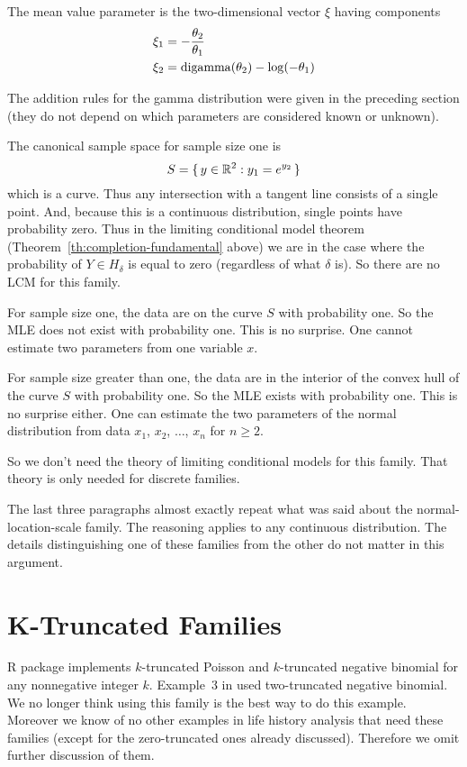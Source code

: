 The mean value parameter is the two-dimensional vector $\xi$ having components
\begin{align*}
   \xi_1
   & =
   - \frac{\theta_2}{\theta_1}
   \\
   \xi_2
   & =
   \operatorname{digamma}(\theta_2) - \log(- \theta_1)
\end{align*}

The addition rules for the gamma distribution were given in the preceding
section (they do not depend on which parameters are considered known or
unknown).

The canonical sample space for sample size one is
$$
   S = \{\,  y \in \mathbb{R}^2 : y_1 = e^{y_2}  \,\}
$$
which is a curve.  Thus any intersection with a tangent line consists of
a single point.  And, because this is a continuous distribution, single points
have probability zero.  Thus in the limiting conditional model theorem
(Theorem~\ref{th:completion-fundamental} above) we are in the case where
the probability of $Y \in H_\delta$ is equal to zero
(regardless of what $\delta$ is).  So there are no LCM for this family.

For sample size one, the data are on the curve $S$ with probability one.
So the MLE does not exist with probability one.  This is no surprise.
One cannot estimate two parameters from one variable $x$.

For sample size greater than one, the data are in the interior of the convex
hull of the curve $S$ with probability one.
So the MLE exists with probability one.  This is no surprise either.
One can estimate the two parameters of the normal distribution from
data $x_1$, $x_2$, $\ldots$, $x_n$ for $n \ge 2$.

So we don't need the theory of limiting conditional models for this family.
That theory is only needed for discrete families.

The last three paragraphs almost exactly repeat what was said about
the normal-location-scale family.  The reasoning applies to any continuous
distribution.  The details distinguishing one of these families from the
other do not matter in this argument.

\section{K-Truncated Families}

R package  implements $k$-truncated Poisson and $k$-truncated
negative binomial for any nonnegative integer $k$.  Example~{3} in
\citet{aster2} used two-truncated negative binomial.  We no longer think
using this family is the best way to do this example.  Moreover we know
of no other examples in life history analysis that need these families
(except for the zero-truncated ones already discussed).  Therefore
we omit further discussion of them.

